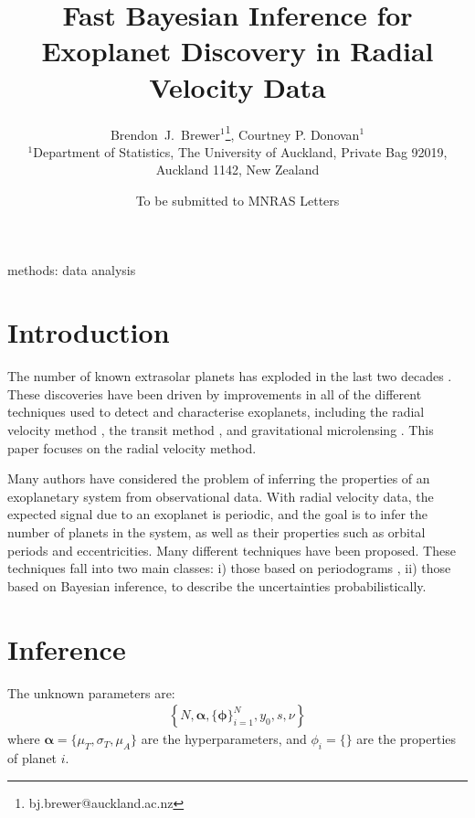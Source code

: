 \documentclass[useAMS,usenatbib]{mn2e}
\title[]
{Fast Bayesian Inference for Exoplanet Discovery in Radial Velocity Data}
\author[Brewer]{%
  Brendon~J.~Brewer$^{1}$\thanks{bj.brewer@auckland.ac.nz},
  Courtney P. Donovan$^{1}$
  \medskip\\
  $^1$Department of Statistics, The University of Auckland, Private Bag 92019, Auckland 1142, New Zealand}
\begin{document}
             
\date{To be submitted to MNRAS Letters}
             
\maketitle

\label{firstpage}


\begin{abstract}
\end{abstract}

\begin{keywords}
methods: data analysis
\end{keywords}


\section{Introduction}
The number of known extrasolar planets has exploded in the last two
decades \citep{}. These discoveries have been driven by improvements in
all of the different techniques used to detect and characterise exoplanets,
including the radial velocity method \citep[e.g.][]{},
the transit method \citep[e.g.]{},
and gravitational microlensing \citep[e.g.][]{}. This paper focuses on the
radial velocity method.

Many authors have considered the problem of inferring the properties of an
exoplanetary system from observational data. With radial velocity data,
the expected signal due to an exoplanet is periodic, and the goal is to
infer the number of planets in the system, as well as their properties such
as orbital periods and eccentricities. Many
different techniques have been proposed. These techniques fall into two main
classes: i) those based on periodograms \citep[e.g.][]{}, ii) those based on
Bayesian inference, to describe the uncertainties probabilistically.

\section{Inference}

The unknown parameters are:
\begin{eqnarray}
\left\{N, \boldsymbol{\alpha}, \{\boldsymbol{\phi}\}_{i=1}^N, y_0, s, \nu\right\}
\end{eqnarray}
where $\boldsymbol{\alpha} = \{\mu_T, \sigma_T, \mu_A\}$ are the
hyperparameters, and $\phi_i = \{\}$ are the properties of planet $i$.
\end{document}
